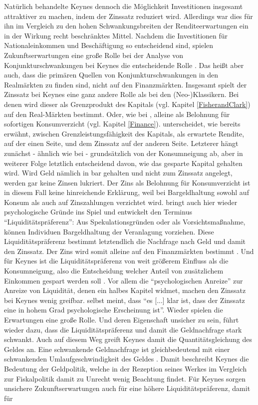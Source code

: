 Natürlich behandelte Keynes dennoch die Möglichkeit Investitionen insgesamt attraktiver zu machen, indem der Zinssatz reduziert wird. Allerdings war dies für ihn im Vergleich zu den hohen Schwankungsbreiten der Renditeerwartungen ein in der Wirkung recht beschränktes Mittel. Nachdem die Investitionen für Nationaleinkommen und Beschäftigung so entscheidend sind, spielen Zukunftserwartungen eine große Rolle bei der Analyse von Konjunkturschwankungen bei Keynes die entscheidende Rolle \parencite[S. 313]{Keynes1936}. Das heißt aber auch, dass die primären Quellen von Konjunkturschwankungen in den Realmärkten zu finden sind, nicht auf den Finanzmärkten. Insgesamt spielt der Zinssatz bei Keynes eine ganz andere Rolle als bei den (Neo-)Klassikern. Bei denen wird dieser als Grenzprodukt des Kapitals (vgl. Kapitel \ref{FisherandClark}) auf den Real-Märkten bestimmt. Oder, wie bei \textcite{Fisher1930}, alleine als Belohnung für sofortigen Konsumverzicht (vgl. Kapitel \ref{Finance}). \textcite[S. 165]{Keynes1936} unterscheidet, wie bereits erwähnt, zwischen Grenzleistungsfähigkeit des Kapitals, als erwartete Rendite, auf der einen Seite, und dem Zinssatz auf der anderen Seite. Letzterer hängt zunächst - ähnlich wie bei \textcite{Fisher1930} - grundsätzlich von der Konsumneigung \parencite[S. 166]{Keynes1936} ab, aber in weiterer Folge letztlich entscheidend davon, wie das gesparte Kapital gehalten wird. Wird Geld nämlich in bar gehalten und nicht zum Zinssatz angelegt, werden gar keine Zinsen lukriert. Der Zins als Belohnung für Konsumverzicht ist in diesem Fall keine hinreichende Erklärung, weil bei Bargeldhaltung sowohl auf Konsum als auch auf Zinszahlungen verzichtet wird. \textcite[S. 194]{Keynes1936} bringt auch hier wieder psychologische Gründe ins Spiel und entwickelt den Terminus "`Liquiditätspräferenz"': Aus Spekulationsgründen oder als Vorsichtsmaßnahme, können Individuen Bargeldhaltung der Veranlagung vorziehen. Diese Liquiditätspräferenz bestimmt letztendlich die Nachfrage nach Geld und damit den Zinssatz. Der Zins wird somit alleine auf den Finanzmärkten bestimmt \parencite[S. 62]{Snowdon2005}. Und für Keynes ist die Liquiditätspräferenz von weit größerem Einfluss als die Konsumneigung, also die Entscheidung welcher Anteil von zusätzlichem Einkommen gespart werden soll \parencite[S. 63]{Snowdon2005}. Vor allem die "`psychologischen Anreize"' zur Anreize von Liquidität, denen \textcite[S. 194ff]{Keynes1936} ein halbes Kapitel widmet, machen den Zinssatz bei Keynes wenig greifbar. \textcite[S. 202]{Keynes1936} selbst meint, dass "`es [...] klar ist, dass der Zinssatz eine in hohem Grad psychologische Erscheinung ist"'. Wieder spielen die Erwartungen eine große Rolle. Und deren Eigenschaft unsicher zu sein, führt wieder dazu, dass die Liquiditätspräferenz und damit die Geldnachfrage stark schwankt. Auch auf diesem Weg greift Keynes damit die Quantitätsgleichung des Geldes an. Eine schwankende Geldnachfrage ist gleichbedeutend mit einer schwankenden Umlaufgeschwindigkeit des Geldes \parencite[S. 201]{Keynes1936}. Damit beschreibt Keynes die Bedeutung der Geldpolitik, welche in der Rezeption seines Werkes im Vergleich zur Fiskalpolitik damit zu Unrecht wenig Beachtung findet. Für Keynes sorgen unsichere Zukunftserwartungen auch für eine höhere Liquiditätspräferenz, damit für 